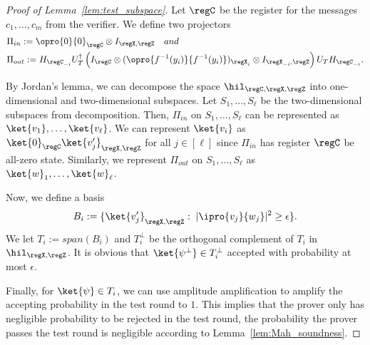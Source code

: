 \begin{proof}[Proof of Lemma~\ref{lem:test_subspace}]

Let $\regC$ be the register for the messages $c_1,\dots,c_m$ from the verifier. We define two projectors
\begin{align*}
    &\Pi_{in} := \opro{0}{0}_{\regC}\otimes I_{\regX,\regZ}\quad and \\
    &\Pi_{out} := H_{\regC_{-i}}U_T^{\dag}\left(I_{\regC}\otimes(\opro{f^{-1}(y_i)}{f^{-1}(y_i)})_{\regX_i}\otimes I_{\regX_{-i},\regZ}\right)U_T H_{\regC_{-i}}.  
\end{align*}

By Jordan's lemma, we can decompose the space $\hil_{\regC,\regX,\regZ}$ into one-dimensional and two-dimensional subspaces. Let $S_1,\dots,S_{\ell}$ be the two-dimensional subspaces from decomposition. Then, $\Pi_{in}$ on $S_1,\dots,S_{\ell}$ can be represented as $\ket{v_1},\dots,\ket{v_{\ell}}$. We can represent $\ket{v_i}$ as $\ket{0}_{\regC}\ket{v'_j}_{\regX,\regZ}$ for all $j\in [\ell]$ since $\Pi_{in}$ has register $\regC$ be all-zero state. Similarly, we represent $\Pi_{out}$ on $S_1,\dots,S_{\ell}$ as $\ket{w}_1,\dots,\ket{w}_{\ell}$. 

Now, we define a basis 
\begin{align*}
    B_i := \{\ket{v'_j}_{\regX,\regZ}:\; |\ipro{v_j}{w_j}|^2\geq \epsilon\}. 
\end{align*}
We let $T_i := span(B_i)$ and $T_i^{\bot}$ be the orthogonal complement of $T_i$ in $\hil_{\regX,\regZ}$. It is obvious that $\ket{\psi^{\bot}}\in T_i^{\bot}$ accepted with probability at most $\epsilon$. 


Finally, for $\ket{\psi}\in T_i$, we can use amplitude amplification to amplify the accepting probability in the test round to $1$. This implies that the prover only has negligible probability to be rejected in the test round, the probability the prover passes the test round is negligible according to Lemma~\ref{lem:Mah_soundness}. 

\end{proof}

